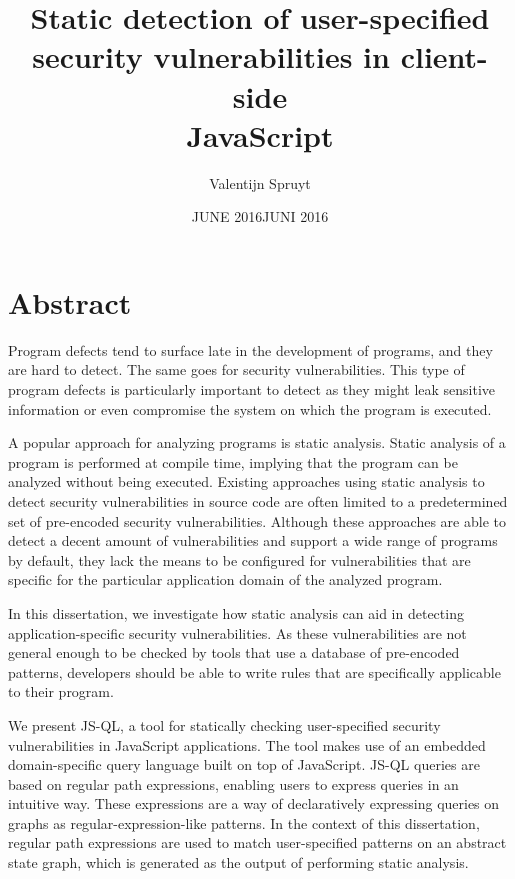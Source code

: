 \documentclass[a4paper, 12pt]{report}
\author{Valentijn Spruyt}
\title{Static detection of user-specified \\ security vulnerabilities in client-side\\ JavaScript}
\date{JUNE 2016}
\theoremstyle{definition}
\begin{document}
\maketitlepage
 
 
\date{JUNI 2016}
 
\maketitlepage


\chapter*{Abstract}

Program defects tend to surface late in the development of programs, and they are hard to detect.
The same goes for security vulnerabilities. This type of program defects is particularly important to detect as they might leak sensitive information or even compromise the system on which the program is executed.

A popular approach for analyzing programs is static analysis. Static analysis of a program is performed at compile time, implying that the program can be analyzed without being executed.
 Existing approaches using static analysis to detect security vulnerabilities in source code are often limited to a predetermined set of pre-encoded security vulnerabilities. Although these approaches are able to detect a decent amount of vulnerabilities and support a wide range of programs by default, they lack the means to be configured for vulnerabilities that are specific for the particular application domain of the analyzed program.

In this dissertation, we investigate how static analysis can aid in detecting application-specific security vulnerabilities. As these vulnerabilities are not general enough to be checked by tools that use a database of pre-encoded patterns, developers should be able to write rules that are specifically applicable to their program. 

We present JS-QL, a tool for statically checking user-specified security vulnerabilities in JavaScript applications. The tool makes use of an embedded domain-specific query language built on top of JavaScript. JS-QL queries are based on regular path expressions, enabling users to express queries in an intuitive way. These expressions are a way of declaratively expressing queries on graphs as regular-expression-like patterns. In the context of this dissertation, regular path expressions are used to match user-specified patterns on an abstract state graph, which is generated as the output of performing static analysis. 
\end{document}
